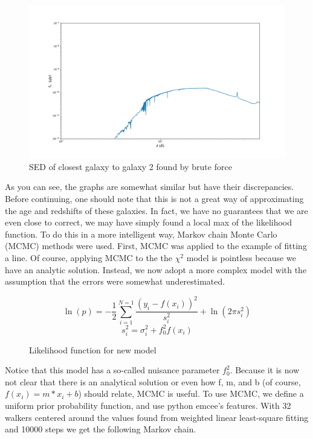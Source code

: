 \documentclass{article}
\begin{document}
\begin{figure}[H]
  \centering
\includegraphics[scale=0.25]{SED closest galaxy 2}
\caption{SED of closest galaxy to galaxy 2 found by brute force}
\end{figure}

As you can see, the graphs are somewhat similar but have their discrepancies. Before continuing, one
should note that this is not a great way of approximating the age and redshifts of these galaxies.
In fact, we have no guarantees that we are even close to correct, we may have simply found a local
max of the likelihood function. To do this in a more intelligent way, Markov chain Monte Carlo
(MCMC) methods were used. First, MCMC was applied to the example of fitting a line. Of course,
applying MCMC to the the $\chi ^2$ model is pointless because we have an analytic solution. Instead,
we now adopt a more complex model with the assumption that the errors were somewhat underestimated.

\begin{figure}[H]
\[\ln({p}) = -\frac{1}{2} \sum_{i=1}^{N = 1} \frac{(y_i - f(x_i))^2}{s_i^2} + \ln({2\pi s_i^2})\]
\[ s_i^2 = \sigma_{i}^2 + f_0^2 f(x_i)\]
\caption{Likelihood function for new model}
\end{figure}

Notice that this model has a so-called nuisance parameter $f_0^2$. Because it is now not clear that
there is an analytical solution or even how f, m, and b (of course, $f(x_i) = m*x_i + b$) should
relate, MCMC is useful. To use MCMC, we define a uniform prior probability function, and use python
emcee's features. With 32 walkers centered around the values found from weighted linear least-square fitting and
10000 steps we get the following Markov chain.
\end{document}
